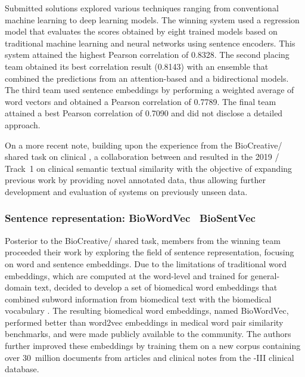 Submitted solutions explored various techniques ranging from conventional machine learning to deep learning models.
The winning system \parencite{chen2018d} used a regression model that evaluates the scores obtained by eight trained models based on traditional machine learning and neural networks using sentence encoders.
This system attained the highest Pearson correlation of 0.8328.
The second placing team \parencite{xiong2018a} obtained its best correlation result (0.8143) with an ensemble that combined the predictions from an attention-based  and a bidirectional  models.
The third team \parencite{liu2018c} used sentence embeddings by performing a weighted average of word vectors and obtained a Pearson correlation of 0.7789.
The final team attained a best Pearson correlation of 0.7090 and did not disclose a detailed approach.

On a more recent note, building upon the experience from the BioCreative/ shared task on clinical , a collaboration between  and  resulted in the 2019 / Track~1 on clinical semantic textual similarity \parencite{wang2020d} with the objective of expanding previous work by providing novel annotated data, thus allowing further development and evaluation of systems on previously unseen data.


\subsubsection{Sentence representation: BioWordVec \versus\ BioSentVec}

Posterior to the BioCreative/ shared task, members from the winning team proceeded their work by exploring the field of sentence representation, focusing on word and sentence embeddings.
Due to the limitations of traditional word embeddings, which are computed at the word-level and trained for general-domain text, \textcite{zhang2019c} decided to develop a set of biomedical word embeddings that combined subword information from biomedical text with the biomedical vocabulary .
The resulting biomedical word embeddings, named BioWordVec, performed better than word2vec embeddings in medical word pair similarity benchmarks, and were made publicly available to the community.
The authors further improved these embeddings by training them on a new corpus containing over 30~million documents from  articles and clinical notes from the -III clinical database.


